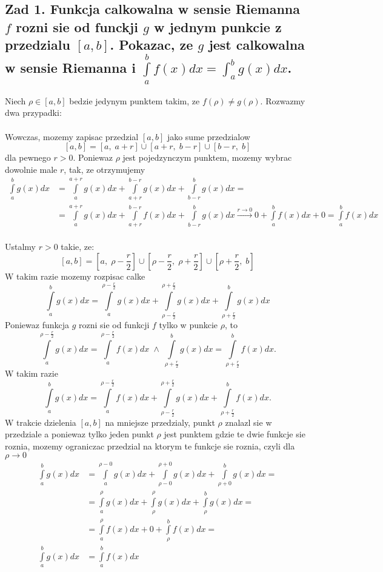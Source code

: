 \documentclass{article}
\begin{document}
\ttfamily
\subsection*{Zad 1. Funkcja calkowalna w sensie Riemanna $f$ rozni sie od funckji $g$ w jednym punkcie z przedzialu $[a,b]$. Pokazac, ze $g$ jest calkowalna w sensie Riemanna i $\int\limits_a^bf(x)dx=\int_a^bg(x)dx$.}
    Niech $\rho\in[a,b]$ bedzie jedynym punktem takim, ze $f(\rho)\neq g(\rho)$. Rozwazmy dwa przypadki:\medskip\\
     \smallskip\\
    Wowczas, mozemy zapisac przedzial $[a,b]$ jako sume przedzialow
    $$[a,b]=[a, \;a+r]\cup[a+r,\; b-r]\cup[b-r,\; b]$$
    dla pewnego $r>0$. Poniewaz $\rho$ jest pojedzynczym punktem, mozemy wybrac dowolnie male $r$, tak, ze otrzymujemy
    \begin{align*}
        \int\limits_a^bg(x)dx&=\int\limits_a^{a+r}g(x)dx+\int\limits_{a+r}^{b-r}g(x)dx+\int\limits_{b-r}^{b}g(x)dx=\\
        &=\int\limits_a^{a+r}g(x)dx+\int\limits_{a+r}^{b-r}f(x)dx+\int\limits_{b-r}^{b}g(x)dx\xrightarrow{r\to0}0+\int\limits_a^bf(x)dx+0=\int\limits_a^bf(x)dx
    \end{align*}
    \smallskip\\
    Ustalmy $r>0$ takie, ze:
    $$[a,b]=\left[a, \;\rho-\frac r2\right]\cup\left[\rho-\frac r2,\; \rho+\frac r2\right]\cup\left[\rho+\frac r2,\; b\right]$$
    W takim razie mozemy rozpisac calke
    $$\int\limits_a^bg(x)dx=\int\limits_a^{\rho-\frac r2}g(x)dx+\int\limits_{\rho-\frac r2}^{\rho+\frac r2}g(x)dx+\int\limits_{\rho+\frac r2}^bg(x)dx$$
    Poniewaz funkcja $g$ rozni sie od funkcji $f$ tylko w punkcie $\rho$, to
    $$\int\limits_a^{\rho-\frac r2}g(x)dx=\int\limits_a^{\rho-\frac r2}f(x)dx\;\land\;\int\limits_{\rho+\frac r2}^bg(x)dx=\int\limits_{\rho+\frac r2}^bf(x)dx.$$
    W takim razie
    $$\int\limits_a^bg(x)dx=\int\limits_a^{\rho-\frac r2}f(x)dx+\int\limits_{\rho-\frac r2}^{\rho+\frac r2}g(x)dx+\int\limits_{\rho+\frac r2}^bf(x)dx.$$
    W trakcie dzielenia $[a,b]$ na mniejsze przedzialy, punkt $\rho$ znalazl sie w przedziale 
    a poniewaz tylko jeden punkt $\rho$ jest punktem gdzie te dwie funkcje sie roznia, mozemy ograniczac przedzial na ktorym te funkcje sie roznia, czyli dla $\rho\to0$
    \begin{align*}
        \int\limits_a^bg(x)dx&=\int\limits_a^{\rho-0}g(x)dx+\int\limits_{\rho-0}^{\rho+0}g(x)dx+\int\limits_{\rho+0}^bg(x)dx=\\
        &=\int\limits_a^{\rho}g(x)dx+\int\limits_{\rho}^{\rho}g(x)dx+\int\limits_{\rho}^bg(x)dx=\\
        &=\int\limits_a^\rho f(x)dx+0+\int\limits_\rho^bf(x)dx=\\
        \int\limits_a^bg(x)dx&=\int\limits_a^bf(x)dx
    \end{align*}
\end{document}
